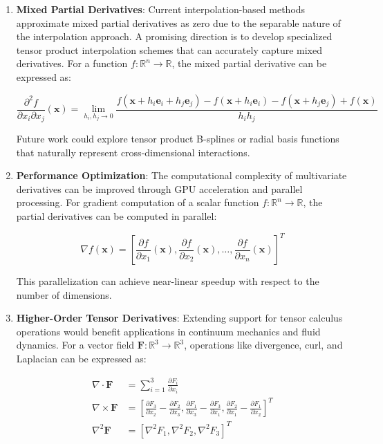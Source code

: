 \documentclass[10pt,journal,compsoc]{IEEEtran}
\begin{document}
\begin{enumerate}
    \item \textbf{Mixed Partial Derivatives}: Current interpolation-based methods approximate mixed partial derivatives as zero due to the separable nature of the interpolation approach. A promising direction is to develop specialized tensor product interpolation schemes that can accurately capture mixed derivatives. For a function $f: \mathbb{R}^n \rightarrow \mathbb{R}$, the mixed partial derivative can be expressed as:
    
    \begin{equation}
        \frac{\partial^2 f}{\partial x_i \partial x_j}(\mathbf{x}) = \lim_{h_i, h_j \to 0} \frac{f(\mathbf{x} + h_i\mathbf{e}_i + h_j\mathbf{e}_j) - f(\mathbf{x} + h_i\mathbf{e}_i) - f(\mathbf{x} + h_j\mathbf{e}_j) + f(\mathbf{x})}{h_i h_j}
    \end{equation}
    
    Future work could explore tensor product B-splines or radial basis functions that naturally represent cross-dimensional interactions.
    
    \item \textbf{Performance Optimization}: The computational complexity of multivariate derivatives can be improved through GPU acceleration and parallel processing. For gradient computation of a scalar function $f: \mathbb{R}^n \rightarrow \mathbb{R}$, the partial derivatives can be computed in parallel:
    
    \begin{equation}
        \nabla f(\mathbf{x}) = \left[ \frac{\partial f}{\partial x_1}(\mathbf{x}), \frac{\partial f}{\partial x_2}(\mathbf{x}), \ldots, \frac{\partial f}{\partial x_n}(\mathbf{x}) \right]^T
    \end{equation}
    
    This parallelization can achieve near-linear speedup with respect to the number of dimensions.
    
    \item \textbf{Higher-Order Tensor Derivatives}: Extending support for tensor calculus operations would benefit applications in continuum mechanics and fluid dynamics. For a vector field $\mathbf{F}: \mathbb{R}^3 \rightarrow \mathbb{R}^3$, operations like divergence, curl, and Laplacian can be expressed as:
    
    \begin{align}
        \nabla \cdot \mathbf{F} &= \sum_{i=1}^{3} \frac{\partial F_i}{\partial x_i} \\[5pt]
        \nabla \times \mathbf{F} &= \left[ \frac{\partial F_3}{\partial x_2} - \frac{\partial F_2}{\partial x_3}, \frac{\partial F_1}{\partial x_3} - \frac{\partial F_3}{\partial x_1}, \frac{\partial F_2}{\partial x_1} - \frac{\partial F_1}{\partial x_2} \right]^T \\[5pt]
        \nabla^2 \mathbf{F} &= \left[ \nabla^2 F_1, \nabla^2 F_2, \nabla^2 F_3 \right]^T
    \end{align}
    

\end{enumerate}
\end{document}
